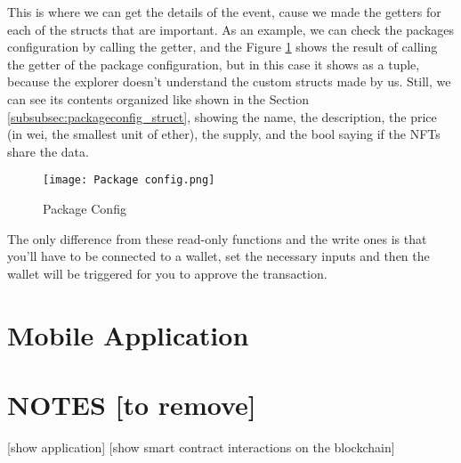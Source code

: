 This is where we can get the details of the event, cause we made the getters
for each of the structs that are important. As an example, we can check the
packages configuration by calling the getter, and the Figure
\ref{fig:package_config} shows the result of calling the getter of the package
configuration, but in this case it shows as a tuple, because the explorer
doesn't understand the custom structs made by us. Still, we can see its
contents organized like shown in the Section
\ref{subsubsec:packageconfig_struct}, showing the name, the description, the
price (in wei, the smallest unit of ether), the supply, and the bool saying if
the NFTs share the data.

\begin{figure}[H]
    \texttt{[image: Package config.png]}
    \centering
    \caption{Package Config}
    \label{fig:package_config}
\end{figure}

The only difference from these read-only functions and the write ones is that
you'll have to be connected to a wallet, set the necessary inputs and then the
wallet will be triggered for you to approve the transaction.

\section{Mobile Application}
\label{sec:mobile_application}

\section{NOTES [to remove]}

 [show application]
 [show smart contract interactions on the blockchain]